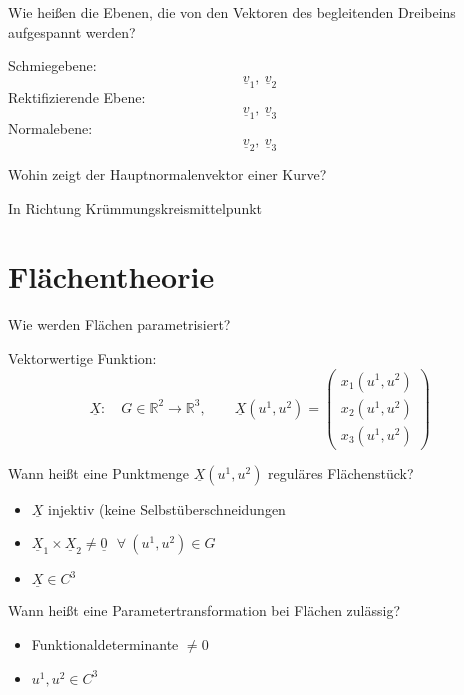 \documentclass[twocolumn, fontsize=8pt, DIV=1]{scrartcl}
\begin{document}
\begin{framed}
    Wie heißen die Ebenen, die von den Vektoren des begleitenden Dreibeins aufgespannt werden?
\end{framed}
Schmiegebene:
\[
    \underline{v}_1,\ \underline{v}_2
\]
Rektifizierende Ebene:
\[
    \underline{v}_1,\ \underline{v}_3
\]
Normalebene:
\[
    \underline{v}_2,\ \underline{v}_3
\]



\begin{framed}
    Wohin zeigt der Hauptnormalenvektor einer Kurve?
\end{framed}
In Richtung Krümmungskreismittelpunkt










\section{Flächentheorie}



\begin{framed}
    Wie werden Flächen parametrisiert?
\end{framed}

Vektorwertige Funktion:
\[
\underline{X}: \quad G \in \mathbb{R}^2 \to \mathbb{R}^3, \qquad 
\underline{X}(u^1, u^2) =
 \left(
 \begin{array}{c}
 x_1(u^1, u^2)\\
 x_2(u^1, u^2)\\
 x_3(u^1, u^2)
 \end{array}
\right) 
\]



\begin{framed}
    Wann heißt eine Punktmenge $\underline{X}(u^1, u^2)$ reguläres Flächenstück?
\end{framed}
\begin{itemize}
    \item $\underline{X}$ injektiv (keine Selbstüberschneidungen
    \item $\underline{X}_1 \times \underline{X}_2 \neq \underline{0}\ \ \ \forall\ (u^1, u^2) \in G$
    \item $\underline{X} \in C^3$
\end{itemize}



\begin{framed}
    Wann heißt eine Parametertransformation bei Flächen zulässig?
\end{framed}
\begin{itemize}
    \item Funktionaldeterminante $\neq 0$
    \item $u^1, u^2 \in C^3$
\end{itemize}
\end{document}
